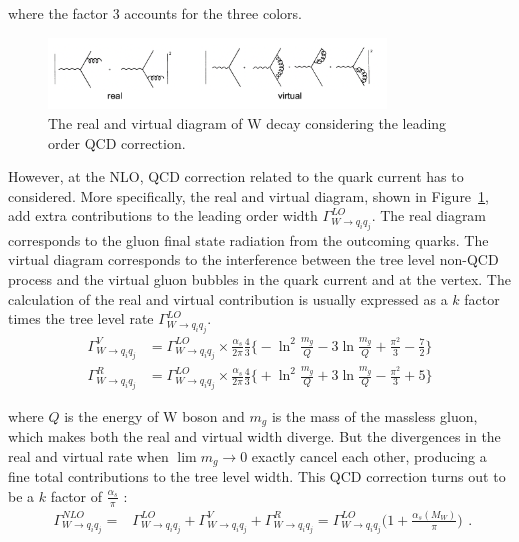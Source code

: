 \noindent  where the factor 3 accounts for the three colors.
\begin{figure}
    \centering
    \includegraphics[width=0.8\textwidth]{chapters/RelatedWorks/sectionVcs/figures/realVirtual.png}
    \caption{ The real and virtual diagram of W decay considering the leading order QCD correction. }
    \label{fig:relatedWorks:vcs:realVirtual}
\end{figure}

\noindent However, at the NLO, QCD correction related to the quark current has to considered. More specifically, the real and virtual diagram, shown in Figure~\ref{fig:relatedWorks:vcs:realVirtual}, add extra contributions to the leading order width $\Gamma_{W \to q_i q_j}^{LO} $. The real diagram corresponds to the gluon final state radiation from the outcoming quarks. The virtual diagram corresponds to the interference between the tree level non-QCD process and the virtual gluon bubbles in the quark current and at the vertex. The calculation of the real and virtual contribution is usually expressed as a $k$ factor times the tree level rate  $\Gamma_{W \to q_i q_j}^{LO} $.
 \begin{align}
 	\Gamma^V_{W \to q_i q_j}  &= \Gamma_{W \to q_i q_j}^{LO} \times \frac{\alpha_s}{2\pi}\frac{4}{3} \bigg \{  -\ln^2\frac{m_g}{Q} -3 \ln\frac{m_g}{Q} + \frac{\pi^2}{3}-\frac{7}{2} \bigg\} \\
    \Gamma^R_{W \to q_i q_j}  &= \Gamma_{W \to q_i q_j}^{LO} \times \frac{\alpha_s}{2\pi}\frac{4}{3} \bigg \{  +\ln^2\frac{m_g}{Q} + 3 \ln\frac{m_g}{Q} - \frac{\pi^2}{3}+ 5 \bigg\}
\end{align}
 
\noindent  where $Q$ is the energy of W boson and $m_g$ is the mass of the massless gluon, which makes both the real and virtual width diverge. But the divergences in the real and virtual rate when $\lim m_g \to 0$ exactly cancel each other, producing a fine total contributions to the tree level width. This QCD correction turns out to be a $k$ factor of $\frac{\alpha_s}{\pi}$ :
\begin{equation}
\begin{split}
    \Gamma_{W \to q_i q_j}^{NLO} =& \Gamma_{W \to q_i q_j}^{LO} + \Gamma^{V}_{W \to q_i q_j}  + \Gamma^{R}_{W \to q_i q_j}
            =   \Gamma_{W \to q_i q_j}^{LO} \big( 1+ \frac{\alpha_s(M_W)}{\pi}\big)
\end{split} .
\end{equation}

